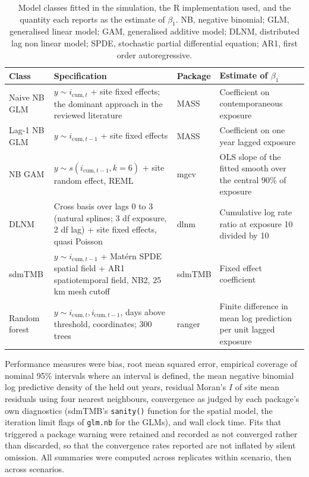 \begin{table}[H]
\centering
\caption{Model classes fitted in the simulation, the R implementation used, and the quantity each reports as the estimate of $\beta_1$. NB, negative binomial; GLM, generalised linear model; GAM, generalised additive model; DLNM, distributed lag non linear model; SPDE, stochastic partial differential equation; AR1, first order autoregressive.}
\label{tab:models}
\small
\begin{tabular}{p{2.4cm}p{5.6cm}p{2.4cm}p{3.6cm}}
\toprule
Class & Specification & Package & Estimate of $\beta_1$ \\
\midrule
Naive NB GLM & $y \sim i_{\mathrm{cum},t}$ + site fixed effects; the dominant approach in the reviewed literature & MASS \citep{venables2002} & Coefficient on contemporaneous exposure \\
Lag-1 NB GLM & $y \sim i_{\mathrm{cum},t-1}$ + site fixed effects & MASS & Coefficient on one year lagged exposure \\
NB GAM & $y \sim s(i_{\mathrm{cum},t-1}, k = 6)$ + site random effect, REML & mgcv \citep{wood2017} & OLS slope of the fitted smooth over the central 90\% of exposure \\
DLNM & Cross basis over lags 0 to 3 (natural splines; 3 df exposure, 2 df lag) + site fixed effects, quasi Poisson & dlnm \citep{gasparrini2011} & Cumulative log rate ratio at exposure 10 divided by 10 \\
sdmTMB & $y \sim i_{\mathrm{cum},t-1}$ + Mat\'ern SPDE spatial field + AR1 spatiotemporal field, NB2, 25 km mesh cutoff & sdmTMB \citep{anderson2022,lindgren2011} & Fixed effect coefficient \\
Random forest & $y \sim i_{\mathrm{cum},t}, i_{\mathrm{cum},t-1}$, days above threshold, coordinates; 300 trees & ranger \citep{wright2017} & Finite difference in mean log prediction per unit lagged exposure \\
\bottomrule
\end{tabular}
\end{table}

Performance measures were bias, root mean squared error, empirical coverage of nominal 95\% intervals where an interval is defined, the mean negative binomial log predictive density of the held out years, residual Moran's $I$ of site mean residuals using four nearest neighbours, convergence as judged by each package's own diagnostics (sdmTMB's \texttt{sanity()} function for the spatial model, the iteration limit flags of \texttt{glm.nb} for the GLMs), and wall clock time. Fits that triggered a package warning were retained and recorded as not converged rather than discarded, so that the convergence rates reported are not inflated by silent omission. All summaries were computed across replicates within scenario, then across scenarios.

